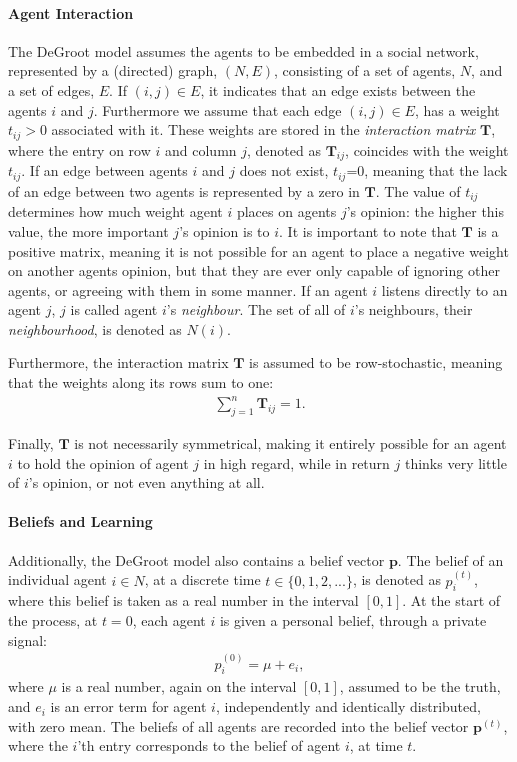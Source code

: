 \documentclass[a4paper, 12pt]{report}
\newcommand{\T}{\bm{T}}
\newcommand{\Tij}{\T_{ij}}
\newcommand{\beli}[3][2]{p_{#2}^{(#3)}}
\begin{document}
\paragraph{Agent Interaction}
\label{interaction:matrix}
The DeGroot model \parencite{degroot1974concensus} assumes the agents to be embedded in a social network, represented by a (directed) graph, $(N, E)$, consisting of a set of agents, $N$, and a set of edges, $E$. If $(i, j)\in E$, it indicates that an edge exists between the agents $i$ and $j$. Furthermore we assume that each edge $(i, j)\in E$, has a weight $t_{ij}>0$ associated with it. These weights are stored in the \emph{interaction matrix} $\T$, where the entry on row $i$ and column $j$, denoted as $\T_{ij}$, coincides with the weight $t_{ij}$. If an edge between agents $i$ and $j$ does not exist, $t_{ij}$=0, meaning that the lack of an edge between two agents is represented by a zero in $\T$. The value of $t_{ij}$ determines how much weight agent $i$ places on agents $j$'s opinion: the higher this value, the more important $j$'s opinion is to $i$. It is important to note that $\T$ is a positive matrix, meaning it is not possible for an agent to place a negative weight on another agents opinion, but that they are ever only capable of ignoring other agents, or agreeing with them in some manner. If an agent $i$ listens directly to an agent $j$, $j$ is called agent $i$'s \emph{neighbour}. The set of all of $i$'s neighbours, their \emph{neighbourhood}, is denoted as $N(i)$.

Furthermore, the interaction matrix $\T$ is assumed to be row-stochastic, meaning that the weights along its rows sum to one:
\begin{align*}
    \sum_{j=1}^{n} \Tij = 1.
\end{align*}

Finally, $\T$ is not necessarily symmetrical, making it entirely possible for an agent $i$ to hold the opinion of agent $j$ in high regard, while in return $j$ thinks very little of $i$'s opinion, or not even anything  at all.

\paragraph{Beliefs and Learning}
\label{beliefs}

Additionally, the DeGroot model also contains a belief vector $\bm{p}$. The belief of an individual agent $i \in N$, at a discrete time $t \in \{0, 1, 2, ...\}$, is denoted as $p_{i}^{(t)}$, where this belief is taken as a real number in the interval $[0, 1]$. At the start of the process, at $t=0$, each agent $i$ is given a personal belief, through a private signal:
\begin{align*}
    \beli{i}{0} = \mu + e_i,
\end{align*}
where $\mu$ is a real number, again on the interval $[0, 1]$, assumed to be the truth, and $e_i$ is an error term for agent $i$, independently and identically distributed, with zero mean.
The beliefs of all agents are recorded into the belief vector $\bm{p}^{(t)}$, where the $i$'th entry corresponds to the belief of agent $i$, at time $t$.
\end{document}
